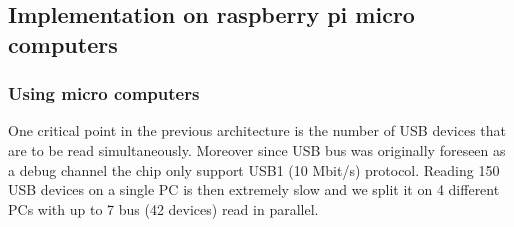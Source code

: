 \documentclass[english]{article}
\begin{document}
\subsection{Implementation on raspberry pi micro computers}
\subsubsection{Using micro computers}
One critical point in the previous architecture is the number of USB devices that are to be read simultaneously. Moreover since USB bus was originally foreseen as a debug channel the chip only support USB1 (10 Mbit/s) protocol. Reading  150 USB devices on a single PC is then extremely slow and we split it on 4 different PCs with up to 7 bus (42 devices) read in parallel.    
\end{document}
